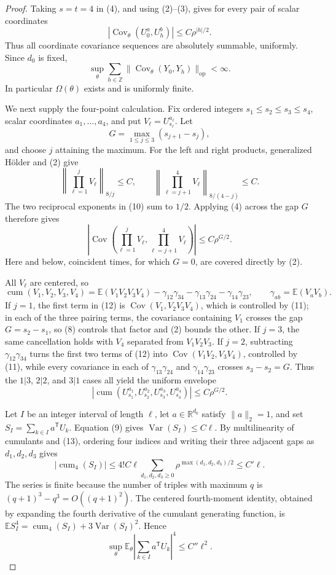 \documentclass{article}
\begin{document}
\begin{proof}
Taking \(s=t=4\) in (4), and using (2)--(3), gives for every pair of scalar coordinates
\[
 |\operatorname{Cov}_\theta(U_0^a,U_h^b)|
 \leq C\rho^{|h|/2}.
\tag{8}
\]
Thus all coordinate covariance sequences are absolutely summable, uniformly.  Since \(d_0\) is fixed,
\[
 \sup_\theta\sum_{h\in\mathbb Z}
 \lVert\operatorname{Cov}_\theta(Y_0,Y_h)\rVert_{\mathrm{op}}<\infty.
\tag{9}
\]
In particular \(\Omega(\theta)\) exists and is uniformly finite.

We next supply the four-point calculation.  Fix ordered integers \(s_1\leq s_2\leq s_3\leq s_4\), scalar coordinates \(a_1,\ldots,a_4\), and put \(V_\ell=U_{s_\ell}^{a_\ell}\).  Let
\[
 G=\max_{1\leq j\leq3}(s_{j+1}-s_j),
\]
and choose \(j\) attaining the maximum.  For the left and right products, generalized H\"older and (2) give
\[
 \left\lVert\prod_{\ell=1}^{j}V_\ell\right\rVert_{8/j}\leq C,
 \qquad
 \left\lVert\prod_{\ell=j+1}^{4}V_\ell\right\rVert_{8/(4-j)}\leq C.
\tag{10}
\]
The two reciprocal exponents in (10) sum to \(1/2\).  Applying (4) across the gap \(G\) therefore gives
\[
 \left|\operatorname{Cov}\left(
 \prod_{\ell=1}^{j}V_\ell,
 \prod_{\ell=j+1}^{4}V_\ell\right)\right|
 \leq C\rho^{G/2}.
\tag{11}
\]
Here and below, coincident times, for which \(G=0\), are covered directly by (2).

All \(V_\ell\) are centered, so
\[
 \operatorname{cum}(V_1,V_2,V_3,V_4)
 =\mathbb E(V_1V_2V_3V_4)
 -\gamma_{12}\gamma_{34}-\gamma_{13}\gamma_{24}-\gamma_{14}\gamma_{23},
 \qquad \gamma_{ab}=\mathbb E(V_aV_b).
\tag{12}
\]
If \(j=1\), the first term in (12) is \(\operatorname{Cov}(V_1,V_2V_3V_4)\), which is controlled by (11); in each of the three pairing terms, the covariance containing \(V_1\) crosses the gap \(G=s_2-s_1\), so (8) controls that factor and (2) bounds the other.  If \(j=3\), the same cancellation holds with \(V_4\) separated from \(V_1V_2V_3\).  If \(j=2\), subtracting \(\gamma_{12}\gamma_{34}\) turns the first two terms of (12) into \(\operatorname{Cov}(V_1V_2,V_3V_4)\), controlled by (11), while every covariance in each of \(\gamma_{13}\gamma_{24}\) and \(\gamma_{14}\gamma_{23}\) crosses \(s_3-s_2=G\).  Thus the \(1|3\), \(2|2\), and \(3|1\) cases all yield the uniform envelope
\[
 |\operatorname{cum}(U_{s_1}^{a_1},U_{s_2}^{a_2},U_{s_3}^{a_3},U_{s_4}^{a_4})|
 \leq C\rho^{G/2}.
\tag{13}
\]

Let \(I\) be an integer interval of length \(\ell\), let \(a\in\mathbb R^{d_0}\) satisfy \(\lVert a\rVert_2=1\), and set \(S_I=\sum_{k\in I}a^{\mathsf T}U_k\).  Equation (9) gives \(\operatorname{Var}(S_I)\leq C\ell\).  By multilinearity of cumulants and (13), ordering four indices and writing their three adjacent gaps as \(d_1,d_2,d_3\) gives
\[
 |\operatorname{cum}_4(S_I)|
 \leq 4!C\ell
 \sum_{d_1,d_2,d_3\geq0}\rho^{\max(d_1,d_2,d_3)/2}
 \leq C'\ell.
\tag{14}
\]
The series is finite because the number of triples with maximum \(q\) is \((q+1)^3-q^3=O((q+1)^2)\).  The centered fourth-moment identity, obtained by expanding the fourth derivative of the cumulant generating function, is \(\mathbb E S_I^4=\operatorname{cum}_4(S_I)+3\operatorname{Var}(S_I)^2\).  Hence
\[
 \sup_\theta\mathbb E_\theta
 \left|\sum_{k\in I}a^{\mathsf T}U_k\right|^4
 \leq C''\ell^2.
\tag{15}
\]


\end{proof}
\end{document}
